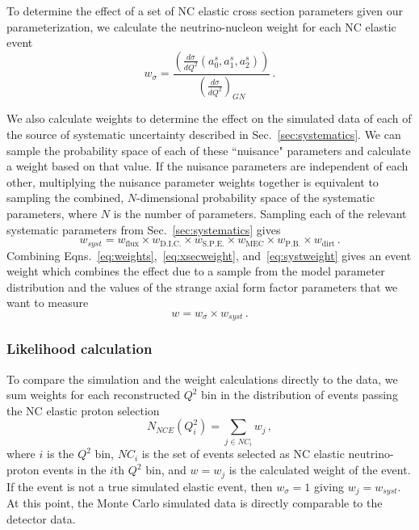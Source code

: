     To determine the effect of a set of NC elastic cross section parameters
    given our parameterization, we calculate the neutrino-nucleon weight for
    each NC elastic event
    \begin{equation}\label{eq:xsecweight}
      w_\sigma = \frac{\left(\frac{d\sigma}{dQ^2}(a_0^s,a_1^s,a_2^s)\right)}
                      {\left(\frac{d\sigma}{dQ^2}\right)_{GN}} \,.
    \end{equation}

    We also calculate weights to determine the effect on the simulated data of
    each of the source of systematic uncertainty described in
    Sec.~\ref{sec:systematics}.  We can sample the probability space of each of
    these ``nuisance" parameters and calculate a weight based on that value.
    If the nuisance parameters are independent of each other, multiplying the
    nuisance parameter weights together is equivalent to sampling the combined,
    $N$-dimensional probability space of the systematic parameters, where $N$
    is the number of parameters. Sampling each of the relevant systematic
    parameters from Sec.~\ref{sec:systematics} gives
    \begin{equation}\label{eq:systweight}
      w_{syst} = w_{\textrm{flux}} \times w_{\textrm{D.I.C.}}\times w_{\textrm{S.P.E.}}\times
                 w_{\textrm{MEC}} \times w_{\textrm{P.B.}} \times w_{\textrm{dirt}}\,.
    \end{equation}
    Combining Eqns.~\ref{eq:weights},~\ref{eq:xsecweight},
    and~\ref{eq:systweight} gives an event weight which combines the effect
    due to a sample from the model parameter distribution and the values of the
    strange axial form factor parameters that we want to measure
    \begin{equation}
      w = w_{\sigma}\times w_{syst} \,.
    \end{equation}

  \subsubsection{Likelihood calculation}\label{sec:likelihood}
    To compare the simulation and the weight calculations directly to the data,
    we sum weights for each reconstructed $Q^2$ bin in the distribution of
    events passing the NC elastic proton selection
    \begin{equation}\label{eq:expected}
      N_{NCE}(Q^2_i) = \sum\limits_{j\in NC_i} w_j \,,
    \end{equation}
    where $i$ is the $Q^2$ bin, $NC_i$ is the set of events selected as NC
    elastic neutrino-proton events in the $i$th $Q^2$ bin, and $w = w_j$ is the
    calculated weight of the event. If the event is not a true simulated
    elastic event, then $w_\sigma = 1$ giving $w_j = w_{syst}$. At this point,
    the Monte Carlo simulated data is directly comparable to the detector data.

